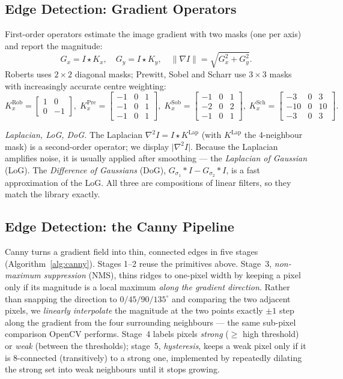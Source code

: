 \documentclass[a4paper,11pt]{article}
\newcommand{\runin}[1]{\par\medskip\noindent\textit{#1}\hspace{0.4em}\ignorespaces}
\begin{document}
\subsection{Edge Detection: Gradient Operators}
First-order operators estimate the image gradient with two masks (one per axis) and
report the magnitude:
\begin{equation}
G_x = I\star K_x,\quad G_y = I\star K_y,\quad
\lVert\nabla I\rVert=\sqrt{G_x^2+G_y^2}.
\label{eq:grad}
\end{equation}
Roberts uses $2\times2$ diagonal masks; Prewitt, Sobel and Scharr use $3\times3$
masks with increasingly accurate centre weighting:
\begin{equation*}
K_x^{\text{Rob}}\!=\!\begin{bmatrix}1&0\\0&-1\end{bmatrix}\!,\;
K_x^{\text{Pre}}\!=\!\begin{bmatrix}-1&0&1\\-1&0&1\\-1&0&1\end{bmatrix}\!,\;
K_x^{\text{Sob}}\!=\!\begin{bmatrix}-1&0&1\\-2&0&2\\-1&0&1\end{bmatrix}\!,\;
K_x^{\text{Sch}}\!=\!\begin{bmatrix}-3&0&3\\-10&0&10\\-3&0&3\end{bmatrix}\!.
\end{equation*}
\runin{Laplacian, LoG, DoG.} The Laplacian $\nabla^2 I = I\star K^{\text{Lap}}$
(with $K^{\text{Lap}}$ the 4-neighbour mask) is a second-order operator; we display
$\lvert\nabla^2 I\rvert$. Because the Laplacian amplifies noise, it is usually
applied after smoothing --- the \emph{Laplacian of Gaussian} (LoG). The
\emph{Difference of Gaussians} (DoG), $G_{\sigma_1}\!*I - G_{\sigma_2}\!*I$, is a
fast approximation of the LoG. All three are compositions of linear filters, so they
match the library exactly.

\subsection{Edge Detection: the Canny Pipeline}
Canny turns a gradient field into thin, connected edges in five stages
(Algorithm~\ref{alg:canny}). Stages 1--2 reuse the primitives above. Stage~3,
\emph{non-maximum suppression} (NMS), thins ridges to one-pixel width by keeping a
pixel only if its magnitude is a local maximum \emph{along the gradient direction}.
Rather than snapping the direction to $0/45/90/135^\circ$ and comparing the two
adjacent pixels, we \emph{linearly interpolate} the magnitude at the two points
exactly $\pm1$ step along the gradient from the four surrounding neighbours --- the
same sub-pixel comparison OpenCV performs. Stage~4 labels pixels \emph{strong}
($\ge$ high threshold) or \emph{weak} (between the thresholds); stage~5,
\emph{hysteresis}, keeps a weak pixel only if it is 8-connected (transitively) to a
strong one, implemented by repeatedly dilating the strong set into weak neighbours
until it stops growing.
\end{document}
